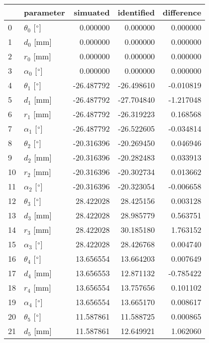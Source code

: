 \documentclass{standalone}%
\begin{document}
%
\normalsize%
\begin{tabular}{llrrr}
\toprule
{} &                 parameter &   simuated & identified & difference \\
\midrule
0  &  $\theta_{0}$ [$\degree$] &   0.000000 &   0.000000 &   0.000000 \\
1  &              $d_{0}$ [mm] &   0.000000 &   0.000000 &   0.000000 \\
2  &              $r_{0}$ [mm] &   0.000000 &   0.000000 &   0.000000 \\
3  &  $\alpha_{0}$ [$\degree$] &   0.000000 &   0.000000 &   0.000000 \\
4  &  $\theta_{1}$ [$\degree$] & -26.487792 & -26.498610 &  -0.010819 \\
5  &              $d_{1}$ [mm] & -26.487792 & -27.704840 &  -1.217048 \\
6  &              $r_{1}$ [mm] & -26.487792 & -26.319223 &   0.168568 \\
7  &  $\alpha_{1}$ [$\degree$] & -26.487792 & -26.522605 &  -0.034814 \\
8  &  $\theta_{2}$ [$\degree$] & -20.316396 & -20.269450 &   0.046946 \\
9  &              $d_{2}$ [mm] & -20.316396 & -20.282483 &   0.033913 \\
10 &              $r_{2}$ [mm] & -20.316396 & -20.302734 &   0.013662 \\
11 &  $\alpha_{2}$ [$\degree$] & -20.316396 & -20.323054 &  -0.006658 \\
12 &  $\theta_{3}$ [$\degree$] &  28.422028 &  28.425156 &   0.003128 \\
13 &              $d_{3}$ [mm] &  28.422028 &  28.985779 &   0.563751 \\
14 &              $r_{3}$ [mm] &  28.422028 &  30.185180 &   1.763152 \\
15 &  $\alpha_{3}$ [$\degree$] &  28.422028 &  28.426768 &   0.004740 \\
16 &  $\theta_{4}$ [$\degree$] &  13.656554 &  13.664203 &   0.007649 \\
17 &              $d_{4}$ [mm] &  13.656553 &  12.871132 &  -0.785422 \\
18 &              $r_{4}$ [mm] &  13.656554 &  13.757656 &   0.101102 \\
19 &  $\alpha_{4}$ [$\degree$] &  13.656554 &  13.665170 &   0.008617 \\
20 &  $\theta_{5}$ [$\degree$] &  11.587861 &  11.588725 &   0.000865 \\
21 &              $d_{5}$ [mm] &  11.587861 &  12.649921 &   1.062060 \\

\end{tabular}
\end{document}
